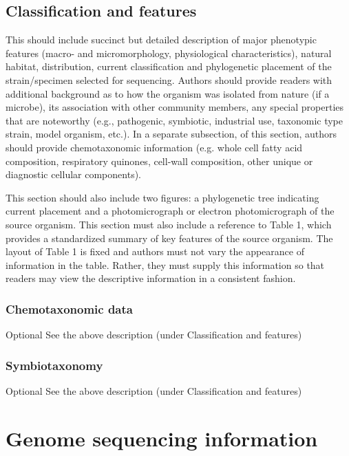 \documentclass{bmcart}
\begin{document}
\subsection*{Classification and features}
This should include succinct but detailed description of major phenotypic features (macro- and micromorphology, physiological characteristics), natural habitat, distribution, current classification and phylogenetic placement of the strain/specimen selected for sequencing. Authors should provide readers with additional background as to how the organism was isolated from nature (if a microbe), its association with other community members, any special properties that are noteworthy (e.g., pathogenic, symbiotic, industrial use, taxonomic type strain, model organism, etc.). In a separate subsection, of this section, authors should provide chemotaxonomic information (e.g. whole cell fatty acid composition, respiratory quinones, cell-wall composition, other unique or diagnostic cellular components).

This section should also include two figures: a phylogenetic tree indicating current placement and a photomicrograph or electron photomicrograph of the source organism. This section must also include a reference to Table 1, which provides a standardized summary of key features of the source organism. The layout of Table 1 is fixed and authors must not vary the appearance of information in the table. Rather, they must supply this information so that readers may view the descriptive information in a consistent fashion.

\subsubsection*{Chemotaxonomic data}
Optional
See the above description (under Classification and features)

\subsubsection*{Symbiotaxonomy}
Optional
See the above description (under Classification and features)


\section*{Genome sequencing information}
\end{document}
